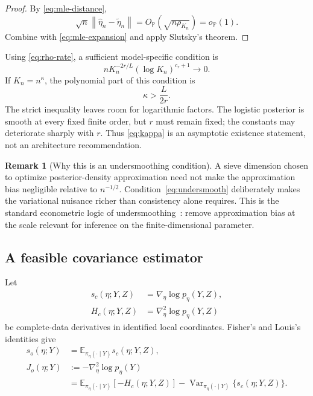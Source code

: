 \documentclass[11pt]{article}
\theoremstyle{definition}
\newtheorem{remark}[theorem]{Remark}
\newcommand{\E}{\mathbb E}
\newcommand{\Pp}{\mathbb P}
\newcommand{\Var}{\operatorname{Var}}
\newcommand{\op}{o_{\Pp}}
\newcommand{\Op}{O_{\Pp}}
\newcommand{\norm}[1]{\left\lVert #1\right\rVert}
\begin{document}
\begin{proof}
By \cref{eq:mle-distance},
\[
\sqrt n\norm{\widehat\eta_n-\widetilde\eta_n}
=
\Op\!\left(\sqrt{n\rho_{K_n}}\right)
=\op(1).
\]
Combine with \cref{eq:mle-expansion} and apply Slutsky's theorem.
\end{proof}

Using \cref{eq:rho-rate}, a sufficient model-specific condition is
\begin{equation}
nK_n^{-2r/L}(\log K_n)^{c_r+1}\longrightarrow0.
\label{eq:K-condition}
\end{equation}
If $K_n=n^\kappa$, the polynomial part of this condition is
\begin{equation}
\kappa>\frac{L}{2r}.
\label{eq:kappa}
\end{equation}
The strict inequality leaves room for logarithmic factors. The logistic posterior is smooth at every fixed finite order, but $r$ must remain fixed; the constants may deteriorate sharply with $r$. Thus \cref{eq:kappa} is an asymptotic existence statement, not an architecture recommendation.

\begin{remark}[Why this is an undersmoothing condition]
A sieve dimension chosen to optimize posterior-density approximation need not make the approximation bias negligible relative to $n^{-1/2}$. Condition~\eqref{eq:undersmooth} deliberately makes the variational nuisance richer than consistency alone requires. This is the standard econometric logic of undersmoothing~\cite{chen2007}: remove approximation bias at the scale relevant for inference on the finite-dimensional parameter.
\end{remark}

\subsection{A feasible covariance estimator}

Let
\begin{align*}
s_c(\eta;Y,Z)
&=\nabla_\eta\log p_\eta(Y,Z),\\
H_c(\eta;Y,Z)
&=\nabla_\eta^2\log p_\eta(Y,Z)
\end{align*}
be complete-data derivatives in identified local coordinates. Fisher's and Louis's identities give~\cite{louis1982}
\begin{align}
s_o(\eta;Y)
&=\E_{\pi_\eta(\cdot\mid Y)}s_c(\eta;Y,Z),
\label{eq:fisher-id}\\
J_o(\eta;Y)
&:=-\nabla_\eta^2\log p_\eta(Y)
\nonumber\\
&=
\E_{\pi_\eta(\cdot\mid Y)}[-H_c(\eta;Y,Z)]
-
\Var_{\pi_\eta(\cdot\mid Y)}\{s_c(\eta;Y,Z)\}.
\label{eq:louis-id}
\end{align}
\end{document}
